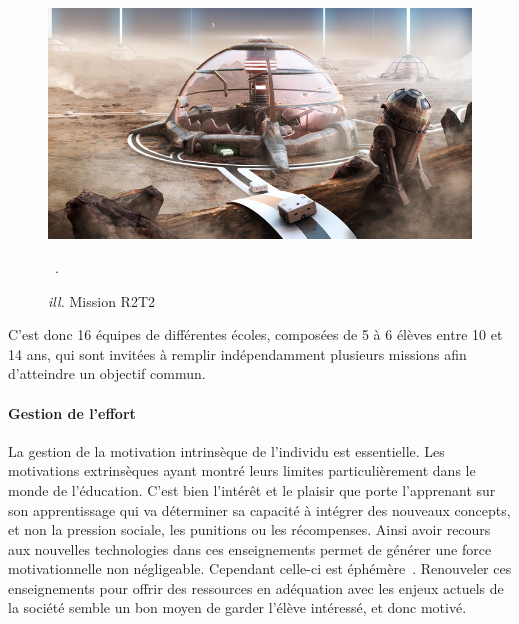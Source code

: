         \begin{figure}[!h]
        \begin{minipage}{0.475\linewidth}
            \centering
            \includegraphics[width=\linewidth]{Figures/thymio-r2t2.jpg}
            \caption[\textit{ill.} Mission R2T2]{\textit{ill.} Mission R2T2~}
            \label{fig:r2t2}
        \end{minipage}
        \hfill
        \begin{minipage}{0.475\linewidth}
        \myDefautStyle
            ~.
            \newline\vfill
        \end{minipage}
        \end{figure}{}\par%
        C'est donc 16 équipes de différentes écoles, composées de 5 à 6 élèves entre 10 et 14 ans, qui sont invitées à remplir indépendamment plusieurs missions afin d'atteindre un objectif commun.
    \paragraph{Gestion de l'effort}
        La gestion de la motivation intrinsèque de l'individu est essentielle. Les motivations extrinsèques ayant montré leurs limites particulièrement dans le monde de l'éducation.
        C'est bien l'intérêt et le plaisir que porte l'apprenant sur son apprentissage qui va déterminer sa capacité à intégrer des nouveaux concepts, et non la pression sociale, les punitions ou les récompenses. Ainsi avoir recours aux nouvelles technologies dans ces enseignements permet de générer une force motivationnelle non négligeable. Cependant celle-ci est éphémère~. Renouveler ces enseignements pour offrir des ressources en adéquation avec les enjeux actuels de la société semble un bon moyen de garder l'élève intéressé, et donc motivé.
